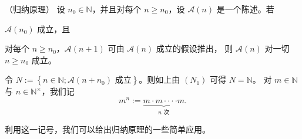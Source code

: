 \begin{proposition}

（归纳原理） 设 $ n_0 \in \mathbb{N} $，并且对每个 $ n \geq n_0 $，设 $ \mathcal{A}(n) $ 是一个陈述。若

\begin{subitems}
\item

$ \mathcal{A}(n_{0}) $ 成立，且

\item

对每个 $ n \geq n_0 $，$ \mathcal{A}(n+1) $ 可由 $ \mathcal{A}(n) $ 成立的假设推出，
则 $ \mathcal{A}(n) $ 对一切 $ n \geq n_0 $ 成立。

\proofhead
令 $N := \left\{ n \in \mathbb{N} ; \mathcal{A}(n + n_0) \text{ 成立} \right\}$。则如上由 $(N_1)$ 可得 $N = \mathbb{N}$。
对 $ m \in \mathbb{N} $ 与 $ n \in \mathbb{N}^\times $，我们记
\[
m^{n}:=\underbrace{m\cdot m\cdot\cdot\cdot\cdot m}_{n\text{ 次}}.
\]

利用这一记号，我们可以给出归纳原理的一些简单应用。

\end{subitems}

\end{proposition}

